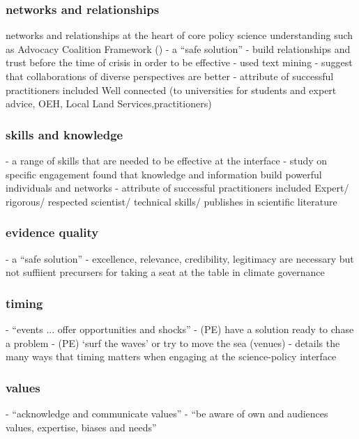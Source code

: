 \subsubsection{networks and relationships}
networks and relationships at the heart of core policy science understanding such as Advocacy Coalition Framework (\cite{Dowding2018})
\cite{CairneyO2020} - a ``safe solution''
\cite{BollykyP2024} - build relationships and trust before the time of crisis in order to be effective
\cite{ArnoldNG2016} - used text mining
\cite{BoswellS2017} - suggest that collaborations of diverse perspectives are better  
\cite{GogginEtAl2015} - attribute of successful practitioners included Well connected (to universities for students and expert advice, OEH, Local Land Services,practitioners)

\subsubsection{skills and knowledge}
\cite{BednarekSHG2015} - a range of skills that are needed to be effective at the interface
\cite{Braun2009} - study on specific engagement found that knowledge and information build powerful individuals and networks
\cite{GogginEtAl2015} - attribute of successful practitioners included Expert/ rigorous/ respected scientist/ technical skills/ publishes in scientific literature

\subsubsection{evidence quality}
\cite{CairneyO2020} - a ``safe solution''
\cite{IbarraJOBCIMRS2022} - excellence, relevance, credibility, legitimacy are necessary but not suffiient precursers for taking a seat at the table in climate governance

\subsubsection{timing}
\cite{CairneyW2017} - ``events ... offer opportunities and shocks''
\cite{Cairney2018} - (PE) have a solution ready to chase a problem
\cite{Cairney2018} - (PE) `surf the waves' or try to move the sea (venues)
\cite{GluckmanBK2021} - details the many ways that timing matters when engaging at the science-policy interface

\subsubsection{values}
\cite{GregoryBW2024} - ``acknowledge and communicate values''
\cite{ElsensohnACDGGKPRS2019} - ``be aware of own and audiences values, expertise, biases and needs''

